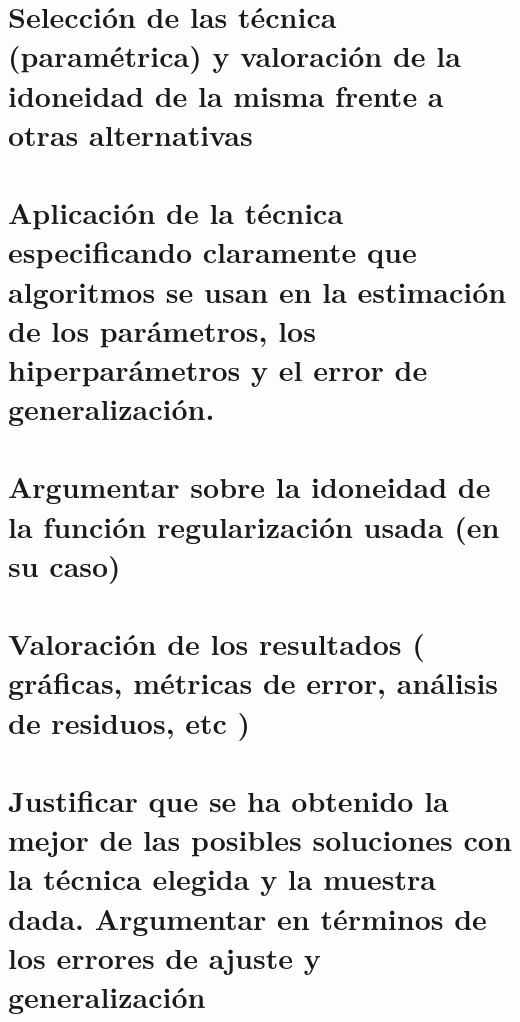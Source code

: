 \documentclass{article}
\begin{document}
	
	
	\section{Selección de las técnica (paramétrica) y valoración de la idoneidad de la misma frente a otras alternativas} %
	
	
	
	\section{Aplicación de la técnica especificando claramente que algoritmos se usan en la estimación de los parámetros, los hiperparámetros y el error de generalización.} %
	
	
	
	\section{Argumentar sobre la idoneidad de la función regularización usada (en su caso)} %
	
	
	
	\section{Valoración de los resultados ( gráficas, métricas de error, análisis de residuos, etc )} %
	
	
	
	\section{Justificar que se ha obtenido la mejor de las posibles soluciones con la técnica elegida y la muestra dada. Argumentar en términos de los errores de ajuste y generalización} %
	
	
	
\end{document}
